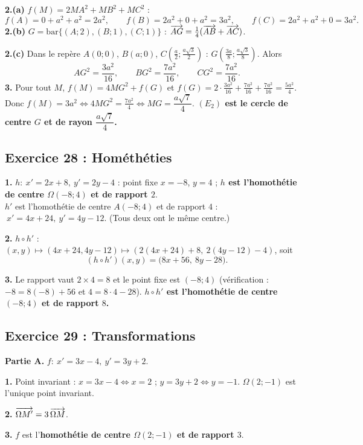 \textbf{2.(a)} $f(M)=2MA^2+MB^2+MC^2$ :
\[
f(A)=0+a^2+a^2=2a^2,\qquad f(B)=2a^2+0+a^2=3a^2,\qquad f(C)=2a^2+a^2+0=3a^2.
\]
\textbf{2.(b)} $G=\mathrm{bar}\{(A;2),(B;1),(C;1)\}$ : $\overrightarrow{AG}=\tfrac14(\overrightarrow{AB}+\overrightarrow{AC})$.

\textbf{2.(c)} Dans le rep\`ere $A(0;0)$, $B(a;0)$, $C\left(\tfrac a2;\tfrac{a\sqrt3}{2}\right)$ :
$G\left(\tfrac{3a}{8};\tfrac{a\sqrt3}{8}\right)$. Alors
\[
AG^2=\frac{3a^2}{16},\qquad BG^2=\frac{7a^2}{16},\qquad CG^2=\frac{7a^2}{16}.
\]
\textbf{3.} Pour tout $M$, $f(M)=4MG^2+f(G)$ et $f(G)=2\cdot\frac{3a^2}{16}+\frac{7a^2}{16}+\frac{7a^2}{16}=\frac{5a^2}{4}$.
Donc $f(M)=3a^2\iff 4MG^2=\frac{7a^2}{4}\iff MG=\dfrac{a\sqrt7}{4}$.
\textbf{$(E_2)$ est le cercle de centre $G$ et de rayon $\dfrac{a\sqrt7}{4}$.}

\subsection{Exercice 28 : Hom\'eth\'eties}

\textbf{1.} $h:\ x'=2x+8,\ y'=2y-4$ : point fixe $x=-8$, $y=4$ ; \textbf{$h$ est l'homoth\'etie de centre $\Omega(-8;4)$ et de rapport $2$}.
\\ $h'$ est l'homoth\'etie de centre $A(-8;4)$ et de rapport $4$ : $\ x'=4x+24,\ y'=4y-12$.
(Tous deux ont le m\^eme centre.)

\textbf{2.} $h\circ h'$ : $(x,y)\mapsto(4x+24,4y-12)\mapsto(2(4x+24)+8,\ 2(4y-12)-4)$, soit
\[
(h\circ h')(x,y)=\bigl(8x+56,\ 8y-28\bigr).
\]

\textbf{3.} Le rapport vaut $2\times4=8$ et le point fixe est $(-8;4)$ (v\'erification : $-8=8(-8)+56$ et $4=8\cdot4-28$).
\textbf{$h\circ h'$ est l'homoth\'etie de centre $(-8;4)$ et de rapport $8$.}

\subsection{Exercice 29 : Transformations}

\textbf{Partie A.} $f:\ x'=3x-4,\ y'=3y+2$.

\textbf{1.} Point invariant : $x=3x-4\iff x=2$ ; $y=3y+2\iff y=-1$. \textbf{$\Omega(2;-1)$} est l'unique point invariant.

\textbf{2.} $\overrightarrow{\Omega M'}=3\,\overrightarrow{\Omega M}$.

\textbf{3.} $f$ est l'\textbf{homoth\'etie de centre $\Omega(2;-1)$ et de rapport $3$}.

